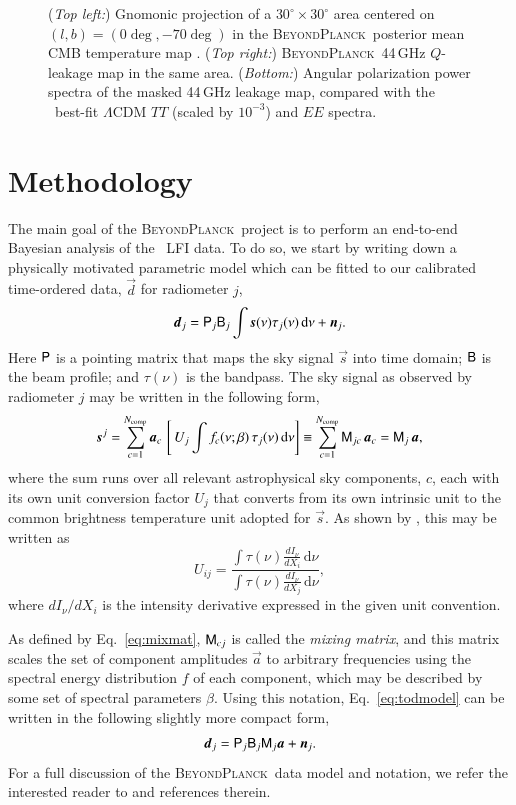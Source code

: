 \documentclass[twocolumn]{aa}
\renewcommand{\d}[0]{\vec{d}}
\newcommand{\n}[0]{\vec{n}}
\newcommand{\s}[0]{\vec{s}}
\renewcommand{\a}[0]{\vec{a}}
\newcommand{\B}[0]{\tens{B}}
\newcommand{\M}[0]{\tens{M}}
\renewcommand{\P}[0]{\tens{P}}
\newcommand{\BP}{\textsc{BeyondPlanck}}
\newcommand{\?}[1]{\textcolor{red}{{\bf [#1]}}}
\begin{document}
\begin{figure}[t]
  \caption{(\emph{Top left:}) Gnomonic projection of a
    $30^\circ\times30^\circ$ area centered on $(l,b)=(0\deg,-70\deg)$
    in the \BP\ posterior mean CMB temperature map
    \citep{bp11}. (\emph{Top right:}) \BP\ 44\,GHz $Q$-leakage map in
    the same area. (\emph{Bottom:}) Angular polarization power spectra
    of the masked 44\,GHz leakage map, compared with the
    \Planck\ best-fit $\Lambda$CDM $TT$ (scaled by $10^{-3}$) and $EE$
    spectra.}\label{fig:beamleakage}
\end{figure}

\section{Methodology}
\label{sec:methods}

The main goal of the \BP\ project is to perform an end-to-end Bayesian analysis
of the \Planck\ LFI data. To do so, we start by writing down a physically
motivated parametric model which can be fitted to our calibrated time-ordered
data, $\d$ for radiometer $j$,
\begin{equation}
  \d_j = \P_j\B_j\int \s(\nu)\tau_j(\nu)\,\mathrm d\nu + \n_j.
  \label{eq:todmodel}
\end{equation}
Here $\P$ is a pointing matrix that maps the sky signal $\s$ into time
domain; $\B$ is the beam profile; and $\tau(\nu)$ is the bandpass. The
sky signal as observed by radiometer $j$ may be written in the
following form,
\begin{equation}
  \s^j = \sum_{c=1}^{N_{\mathrm{comp}}}\a_c\, \left[\,U_j \int f_c(\nu; \beta)\,
    \tau_j(\nu)\,\mathrm d\nu\right] \equiv
  \sum_{c=1}^{N_{\mathrm{comp}}}\M_{jc}\,\a_c = \M_j\,\a,
  \label{eq:mixmat}
\end{equation}
where the sum runs over all relevant astrophysical sky components, $c$, each
with its own unit conversion factor $U_j$ that converts from its own intrinsic
unit to the common brightness temperature unit adopted for $\s$. As shown by
\citep{planck2013-p03d}, this may be written as
\begin{equation}
U_{ij} = \frac{\int \tau(\nu)\frac{dI_{\nu}}{dX_i}\, \mathrm d\nu}{\int
  \tau(\nu)\frac{dI_{\nu}}{dX_j}\,\mathrm d\nu},
\end{equation}
where $dI_{\nu}/dX_i$ is the intensity derivative expressed in the given unit convention.

As defined by Eq.~\eqref{eq:mixmat}, $\M_{cj}$ is called the \emph{mixing
  matrix}, and this matrix scales the set of component amplitudes $\a$ to
arbitrary frequencies using the spectral energy distribution $f$ of each component,
which may be described by some set of spectral parameters
$\beta$. Using this notation, Eq.~\eqref{eq:todmodel} can be written in
the following slightly more compact form,
\begin{equation}
  \d_j = \P_j\B_j\M_j\a + \n_j.
  \label{eq:todmodelmat}
\end{equation}
For a full discussion of the \BP\ data model and notation, we
refer the interested reader to \citet{bp01} and references therein.
\end{document}
